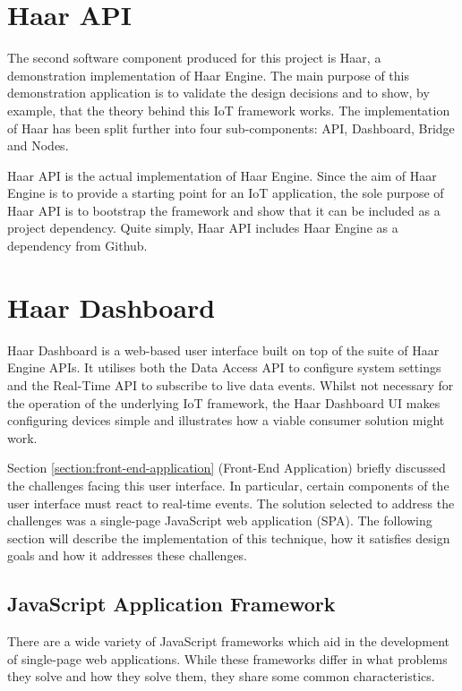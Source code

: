   \section{Haar API}
    The second software component produced for this project is Haar, a demonstration implementation of Haar Engine. The main purpose of this demonstration application is to validate the design decisions and to show, by example, that the theory behind this IoT framework works. The implementation of Haar has been split further into four sub-components: API, Dashboard, Bridge and Nodes.

    Haar API is the actual implementation of Haar Engine. Since the aim of Haar Engine is to provide a starting point for an IoT application, the sole purpose of Haar API is to bootstrap the framework and show that it can be included as a project dependency. Quite simply, Haar API includes Haar Engine as a dependency from Github.

  \section{Haar Dashboard}
    Haar Dashboard is a web-based user interface built on top of the suite of Haar Engine APIs. It utilises both the Data Access API to configure system settings and the Real-Time API to subscribe to live data events. Whilst not necessary for the operation of the underlying IoT framework, the Haar Dashboard UI makes configuring devices simple and illustrates how a viable consumer solution might work.

    Section \ref{section:front-end-application} (Front-End Application) briefly discussed the challenges facing this user interface. In particular, certain components of the user interface must react to real-time events. The solution selected to address the challenges was a single-page JavaScript web application (SPA). The following section will describe the implementation of this technique, how it satisfies design goals and how it addresses these challenges.

    \subsection{JavaScript Application Framework}
      There are a wide variety of JavaScript frameworks which aid in the development of single-page web applications. While these frameworks differ in what problems they solve and how they solve them, they share some common characteristics.

